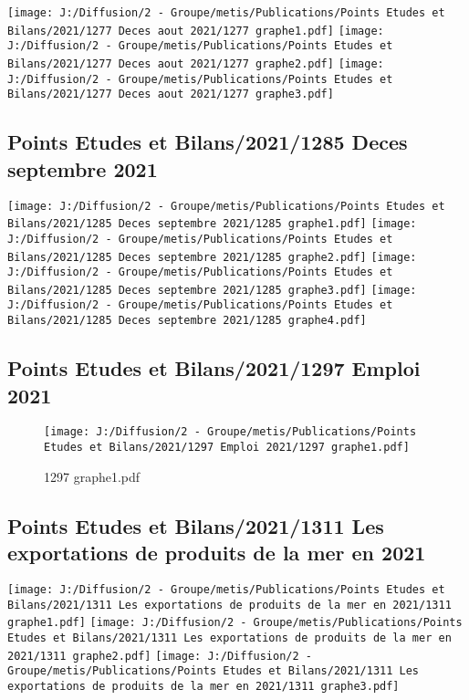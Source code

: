\documentclass[
]{article}
\begin{document}
\texttt{[image: J:/Diffusion/2 - Groupe/metis/Publications/Points Etudes et Bilans/2021/1277 Deces aout 2021/1277 graphe1.pdf]}
\texttt{[image: J:/Diffusion/2 - Groupe/metis/Publications/Points Etudes et Bilans/2021/1277 Deces aout 2021/1277 graphe2.pdf]}
\texttt{[image: J:/Diffusion/2 - Groupe/metis/Publications/Points Etudes et Bilans/2021/1277 Deces aout 2021/1277 graphe3.pdf]}

\hypertarget{points-etudes-et-bilans20211285-deces-septembre-2021}{%
\subsection{Points Etudes et Bilans/2021/1285 Deces septembre
2021}\label{points-etudes-et-bilans20211285-deces-septembre-2021}}

\texttt{[image: J:/Diffusion/2 - Groupe/metis/Publications/Points Etudes et Bilans/2021/1285 Deces septembre 2021/1285 graphe1.pdf]}
\texttt{[image: J:/Diffusion/2 - Groupe/metis/Publications/Points Etudes et Bilans/2021/1285 Deces septembre 2021/1285 graphe2.pdf]}
\texttt{[image: J:/Diffusion/2 - Groupe/metis/Publications/Points Etudes et Bilans/2021/1285 Deces septembre 2021/1285 graphe3.pdf]}
\texttt{[image: J:/Diffusion/2 - Groupe/metis/Publications/Points Etudes et Bilans/2021/1285 Deces septembre 2021/1285 graphe4.pdf]}

\hypertarget{points-etudes-et-bilans20211297-emploi-2021}{%
\subsection{Points Etudes et Bilans/2021/1297 Emploi
2021}\label{points-etudes-et-bilans20211297-emploi-2021}}

\begin{figure}
\centering
\texttt{[image: J:/Diffusion/2 - Groupe/metis/Publications/Points Etudes et Bilans/2021/1297 Emploi 2021/1297 graphe1.pdf]}
\caption{1297 graphe1.pdf}
\end{figure}

\hypertarget{points-etudes-et-bilans20211311-les-exportations-de-produits-de-la-mer-en-2021}{%
\subsection{Points Etudes et Bilans/2021/1311 Les exportations de
produits de la mer en
2021}\label{points-etudes-et-bilans20211311-les-exportations-de-produits-de-la-mer-en-2021}}

\texttt{[image: J:/Diffusion/2 - Groupe/metis/Publications/Points Etudes et Bilans/2021/1311 Les exportations de produits de la mer en 2021/1311 graphe1.pdf]}
\texttt{[image: J:/Diffusion/2 - Groupe/metis/Publications/Points Etudes et Bilans/2021/1311 Les exportations de produits de la mer en 2021/1311 graphe2.pdf]}
\texttt{[image: J:/Diffusion/2 - Groupe/metis/Publications/Points Etudes et Bilans/2021/1311 Les exportations de produits de la mer en 2021/1311 graphe3.pdf]}
\end{document}
